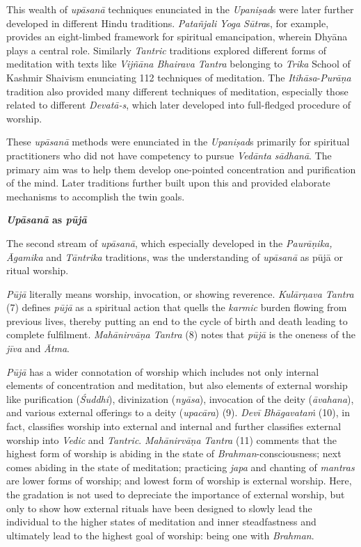 This wealth of \emph{upāsanā} techniques enunciated in the \emph{Upaniṣad}s were later further developed in different Hindu traditions. \emph{Patañjali} \emph{Yoga} \emph{Sūtra}s, for example, provides an eight-limbed framework for spiritual emancipation, wherein Dhyāna plays a central role. Similarly \emph{Tantric} traditions explored different forms of meditation with texts like \emph{Vijñāna Bhairava} \emph{Tantra} belonging to \emph{Trika} School of Kashmir Shaivism enunciating 112 techniques of meditation. The \emph{Itihāsa}-\emph{Purāṇa} tradition also provided many different techniques of meditation, especially those related to different \emph{Devatā-s}, which later developed into full-fledged procedure of worship.

These \emph{upāsanā} methods were enunciated in the \emph{Upaniṣad}s primarily for spiritual practitioners who did not have competency to pursue \emph{Vedānta} \emph{sādhanā}. The primary aim was to help them develop one-pointed concentration and purification of the mind. Later traditions further built upon this and provided elaborate mechanisms to accomplish the twin goals.

\textbf{\emph{Upāsanā} as \emph{pūjā}}

The second stream of \emph{upāsanā}, which especially developed in the \emph{Paurāṇika, Āgamika} and \emph{Tāntrika} traditions, was the understanding of \emph{upāsanā} as pūjā or ritual worship.

\emph{Pūjā} literally means worship, invocation, or showing reverence. \emph{Kulārṇava Tantra} (7) defines \emph{pūjā} as a spiritual action that quells the \emph{karmic} burden flowing from previous lives, thereby putting an end to the cycle of birth and death leading to complete fulfilment. \emph{Mahānirvāṇa Tantra} (8) notes that \emph{pūjā} is the oneness of the \emph{jīva} and \emph{Ātma}.

\emph{Pūjā} has a wider connotation of worship which includes not only internal elements of concentration and meditation, but also elements of external worship like purification (\emph{Śuddhi}), divinization (\emph{nyāsa}), invocation of the deity (\emph{āvahana}), and various external offerings to a deity (\emph{upacāra}) (9). \emph{Devī} \emph{Bhāgavataṁ} (10), in fact, classifies worship into external and internal and further classifies external worship into \emph{Vedic} and \emph{Tantric}. \emph{Mahānirvāṇa} \emph{Tantra} (11) comments that the highest form of worship is abiding in the state of \emph{Brahman}-consciousness; next comes abiding in the state of meditation; practicing \emph{japa} and chanting of \emph{mantras} are lower forms of worship; and lowest form of worship is external worship. Here, the gradation is not used to depreciate the importance of external worship, but only to show how external rituals have been designed to slowly lead the individual to the higher states of meditation and inner steadfastness and ultimately lead to the highest goal of worship: being one with \emph{Brahman}.

